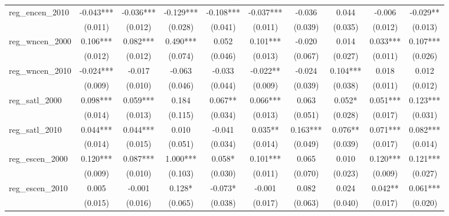 \begin{table}[htbp]
\begin{tabular}{l*{9}{c}}
\addlinespace
reg\_encen\_2010      &   -0.043***&   -0.036***&   -0.129***&   -0.108***&   -0.037***&   -0.036   &    0.044   &   -0.006   &   -0.029** \\
                    &  (0.011)   &  (0.012)   &  (0.028)   &  (0.041)   &  (0.011)   &  (0.039)   &  (0.035)   &  (0.012)   &  (0.013)   \\
\addlinespace
reg\_wncen\_2000      &    0.106***&    0.082***&    0.490***&    0.052   &    0.101***&   -0.020   &    0.014   &    0.033***&    0.107***\\
                    &  (0.012)   &  (0.012)   &  (0.074)   &  (0.046)   &  (0.013)   &  (0.067)   &  (0.027)   &  (0.011)   &  (0.026)   \\
\addlinespace
reg\_wncen\_2010      &   -0.024***&   -0.017   &   -0.063   &   -0.033   &   -0.022** &   -0.024   &    0.104***&    0.018   &    0.012   \\
                    &  (0.009)   &  (0.010)   &  (0.046)   &  (0.044)   &  (0.009)   &  (0.039)   &  (0.038)   &  (0.011)   &  (0.012)   \\
\addlinespace
reg\_satl\_2000       &    0.098***&    0.059***&    0.184   &    0.067** &    0.066***&    0.063   &    0.052*  &    0.051***&    0.123***\\
                    &  (0.014)   &  (0.013)   &  (0.115)   &  (0.034)   &  (0.013)   &  (0.051)   &  (0.028)   &  (0.017)   &  (0.031)   \\
\addlinespace
reg\_satl\_2010       &    0.044***&    0.044***&    0.010   &   -0.041   &    0.035** &    0.163***&    0.076** &    0.071***&    0.082***\\
                    &  (0.014)   &  (0.015)   &  (0.051)   &  (0.034)   &  (0.014)   &  (0.049)   &  (0.039)   &  (0.017)   &  (0.014)   \\
\addlinespace
reg\_escen\_2000      &    0.120***&    0.087***&    1.000***&    0.058*  &    0.101***&    0.065   &    0.010   &    0.120***&    0.121***\\
                    &  (0.009)   &  (0.010)   &  (0.103)   &  (0.030)   &  (0.011)   &  (0.070)   &  (0.023)   &  (0.009)   &  (0.027)   \\
\addlinespace
reg\_escen\_2010      &    0.005   &   -0.001   &    0.128*  &   -0.073*  &   -0.001   &    0.082   &    0.024   &    0.042** &    0.061***\\
                    &  (0.015)   &  (0.016)   &  (0.065)   &  (0.038)   &  (0.017)   &  (0.063)   &  (0.040)   &  (0.017)   &  (0.020)   \\

\end{tabular}
\end{table}
